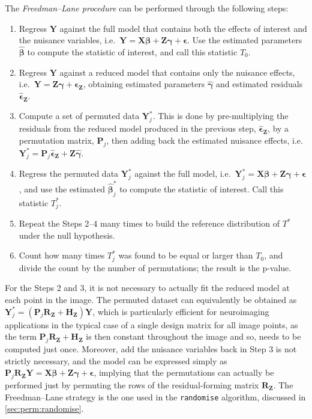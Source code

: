 The \emph{Freedman--Lane procedure} \citep{Freedman1983} can be performed through the following steps:

\begin{enumerate}
\item Regress $\mathbf{Y}$ against the full model that contains both the effects of interest and the nuisance variables, i.e.\ $\mathbf{Y} = \mathbf{X}\boldsymbol{\beta} + \mathbf{Z}\boldsymbol{\gamma} + \boldsymbol{\epsilon}$. Use the estimated parameters $\boldsymbol{\hat{\beta}}$ to compute the statistic of interest, and call this statistic $T_{0}$.
\item Regress $\mathbf{Y}$ against a reduced model that contains only the nuisance effects, i.e.\ $\mathbf{Y} = \mathbf{Z}\boldsymbol{\gamma} + \boldsymbol{\epsilon}_{\mathbf{Z}}$, obtaining estimated parameters $\boldsymbol{\hat{\gamma}}$ and estimated residuals $\boldsymbol{\hat{\epsilon}}_{\mathbf{Z}}$.
\item Compute a set of permuted data $\mathbf{Y}^{*}_{j}$. This is done by pre-multiplying the residuals from the reduced model produced in the previous step, $\boldsymbol{\hat{\epsilon}}_{\mathbf{Z}}$, by a permutation matrix, $\mathbf{P}_{j}$, then adding back the estimated nuisance effects, i.e.\ $\mathbf{Y}^{*}_{j} = \mathbf{P}_{j}\boldsymbol{\hat{\epsilon}}_{\mathbf{Z}} + \mathbf{Z}\boldsymbol{\hat{\gamma}}$. 
\item Regress the permuted data $\mathbf{Y}^{*}_{j}$ against the full model, i.e.\ $\mathbf{Y}^{*}_{j} = \mathbf{X}\boldsymbol{\beta} + \mathbf{Z}\boldsymbol{\gamma} + \boldsymbol{\epsilon}$, and use the estimated $\boldsymbol{\hat{\beta}}^{*}_{j}$ to compute the statistic of interest. Call this statistic $T^{*}_{j}$.
\item Repeat the Steps 2--4 many times to build the reference distribution of $T^{*}$ under the null hypothesis.
\item Count how many times $T^{*}_{j}$ was found to be equal or larger than $T_{0}$, and divide the count by the number of permutations; the result is the p-value.
\end{enumerate}

For the Steps 2 and 3, it is not necessary to actually fit the reduced model at each point in the image. The permuted dataset can equivalently be obtained as $\mathbf{Y}^{*}_{j} = \left(\mathbf{P}_{j}\mathbf{R}_{\mathbf{Z}}+\mathbf{H}_{\mathbf{Z}}\right)\mathbf{Y}$, which is particularly efficient for neuroimaging applications in the typical case of a single design matrix for all image points, as the term $\mathbf{P}_{j}\mathbf{R}_{\mathbf{Z}}+\mathbf{H}_{\mathbf{Z}}$ is then constant throughout the image and so, needs to be computed just once. Moreover, add the nuisance variables back in Step 3 is not strictly necessary, and the model can be expressed simply as $\mathbf{P}_{j}\mathbf{R}_{\mathbf{Z}}\mathbf{Y}=\mathbf{X}\boldsymbol{\beta}+\mathbf{Z}\boldsymbol{\gamma}+\boldsymbol{\epsilon}$, implying that the permutations can actually be performed just by permuting the rows of the residual-forming matrix $\mathbf{R}_{\mathbf{Z}}$. The Freedman--Lane strategy is the one used in the \texttt{randomise} algorithm, discussed in \ref{sec:perm:randomise}.

